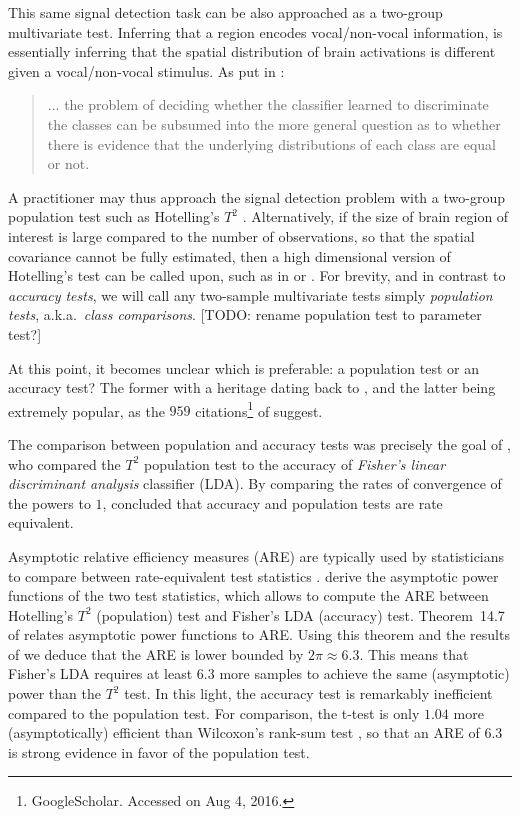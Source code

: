 \documentclass[12pt,a4paper]{article}
\theoremstyle{definition}
\begin{document}
This same signal detection task can be also approached as a two-group multivariate test.
Inferring that a region encodes vocal/non-vocal information, is essentially inferring that the spatial distribution of brain activations is different given a vocal/non-vocal stimulus. 
As put in \cite{pereira_machine_2009}: 
\begin{quote}
... the problem of deciding whether the classifier learned to discriminate the classes can be subsumed into the more general question as to whether there is evidence that the underlying distributions of each class are equal or not.
\end{quote}
A practitioner may thus approach the signal detection problem with a two-group population test such as Hotelling's $T^2$ \citep{anderson_introduction_2003}.
Alternatively, if the size of brain region of interest is large compared to the number of observations, so that the spatial covariance cannot be fully estimated, then a high dimensional version of Hotelling's test can be called upon, such as in \cite{schafer_shrinkage_2005} or \cite{srivastava_multivariate_2007}.
For brevity, and in contrast to \emph{accuracy tests}, we will call any two-sample multivariate tests simply \emph{population tests}, a.k.a.\ \emph{class comparisons}. [TODO: rename population test to parameter test?]


At this point, it becomes unclear which is preferable: a population test or an accuracy test?
The former with a heritage dating back to \cite{hotelling_generalization_1931}, and the latter being extremely popular, as the $959$ citations\footnote{GoogleScholar. Accessed on Aug 4, 2016.} of \cite{kriegeskorte_information-based_2006} suggest. 

The comparison between population and accuracy tests was precisely the goal of \cite{ramdas_classification_2016}, who compared the $T^2$ population test to the accuracy of \emph{Fisher's linear discriminant analysis} classifier (LDA). 
By comparing the rates of convergence of the powers to $1$, \cite{ramdas_classification_2016} concluded that accuracy and population tests are rate equivalent. 

Asymptotic relative efficiency measures (ARE) are typically used by statisticians to compare between rate-equivalent test statistics \citep{vaart_asymptotic_1998}.
\cite{ramdas_classification_2016} derive the asymptotic power functions of the two test statistics, which allows to compute the ARE between Hotelling's $T^2$ (population) test and Fisher's LDA (accuracy) test.
Theorem~14.7 of \cite{vaart_asymptotic_1998} relates asymptotic power functions to ARE.
Using this theorem and the results of \cite{ramdas_classification_2016} we deduce that the ARE is lower bounded by $2 \pi \approx 6.3$. 
This means that Fisher's LDA requires at least $6.3$ more samples to achieve the same (asymptotic) power than the $T^2$ test. 
In this light, the accuracy test is remarkably inefficient compared to the population test.  
For comparison, the t-test is only $1.04$ more (asymptotically) efficient than Wilcoxon's rank-sum test \citep{lehmann_parametric_2009}, so that an ARE of $6.3$ is strong evidence in favor of the population test. 
\end{document}
